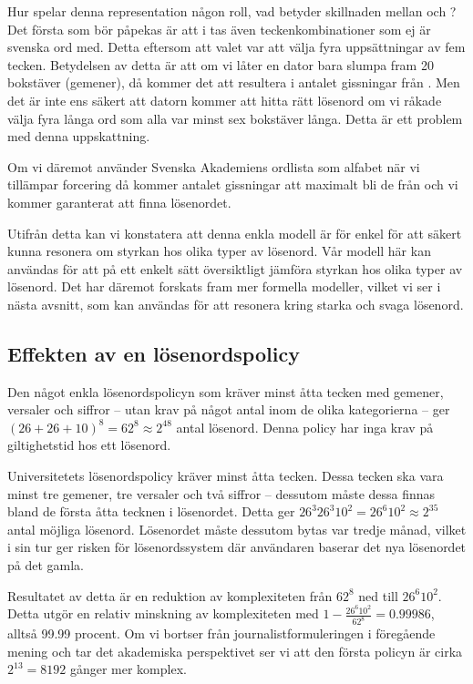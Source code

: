 \documentclass[a4paper]{article}
\theoremstyle{definition}
\theoremstyle{remark}
\begin{document}
Hur spelar denna representation någon roll, vad betyder skillnaden mellan
 och ?
Det första som bör påpekas är att i  tas även
teckenkombinationer som ej är svenska ord med.
Detta eftersom att valet var att välja fyra uppsättningar av fem tecken.
Betydelsen av detta är att om vi låter en dator bara slumpa fram 20 bokstäver
(gemener), då kommer det att resultera i antalet gissningar från
.
Men det är inte ens säkert att datorn kommer att hitta rätt lösenord om vi 
råkade välja fyra långa ord som alla var minst sex bokstäver långa.
Detta är ett problem med denna uppskattning.

Om vi däremot använder Svenska Akademiens ordlista som alfabet när vi tillämpar 
forcering då kommer antalet gissningar att maximalt bli de från
 och vi kommer garanterat att finna lösenordet.

Utifrån detta kan vi konstatera att denna enkla modell är för enkel för att 
säkert kunna resonera om styrkan hos olika typer av lösenord.
Vår modell här kan användas för att på ett enkelt sätt översiktligt jämföra 
styrkan hos olika typer av lösenord.
Det har däremot forskats fram mer formella modeller, vilket vi ser i nästa 
avsnitt, som kan användas för att resonera kring starka och svaga lösenord.

\subsection{Effekten av en lösenordspolicy}

Den något enkla lösenordspolicyn som kräver minst åtta tecken med gemener, 
versaler och siffror -- utan krav på något antal inom de olika kategorierna -- 
ger \( (26 + 26 + 10)^8 = 62^8 \approx 2^{48} \) antal lösenord.
Denna policy har inga krav på giltighetstid hos ett lösenord.

Universitetets lösenordspolicy kräver minst åtta tecken.
Dessa tecken ska vara minst tre gemener, tre versaler och två siffror -- 
dessutom måste dessa finnas bland de första åtta tecknen i lösenordet.
Detta ger \( 26^3 26^3 10^2 = 26^6 10^2 \approx 2^{35} \) antal möjliga 
lösenord.
Lösenordet måste dessutom bytas var tredje månad, vilket i sin tur ger risken 
för lösenordssystem där användaren baserar det nya lösenordet på det gamla.

Resultatet av detta är en reduktion av komplexiteten från \( 62^8 \) ned till 
\( 26^6 10^2 \).
Detta utgör en relativ minskning av komplexiteten med \( 1-\frac{26^6 
10^2}{62^8} = 0.99986 \), alltså 99.99 procent.
Om vi bortser från journalistformuleringen i föregående mening och tar det 
akademiska perspektivet ser vi att den första policyn är cirka \( 2^{13} = 8192 
\) gånger mer komplex.
\end{document}
